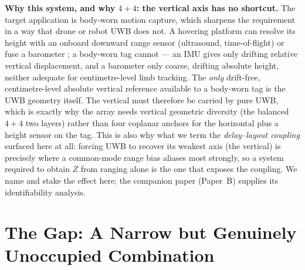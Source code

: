 \documentclass[11pt,a4paper]{article}
\begin{document}
\textbf{Why this system, and why $4{+}4$: the vertical axis has no shortcut.} The target application
is body-worn motion capture, which sharpens the requirement in a way that drone or robot UWB does
not. A hovering platform can resolve its height with an onboard downward range sensor (ultrasound,
time-of-flight) or fuse a barometer \citep{xiang_2025_uav}; a body-worn tag cannot --- an IMU gives only drifting relative
vertical displacement, and a barometer only coarse, drifting absolute height, neither adequate for
centimetre-level limb tracking. The \emph{only} drift-free, centimetre-level absolute vertical
reference available to a body-worn tag is the UWB geometry itself. The vertical must therefore be
carried by pure UWB, which is exactly why the array needs vertical geometric diversity (the balanced
$4{+}4$ two layers) rather than four coplanar anchors for the horizontal plus a height sensor on the tag.
This is also why what we term the \emph{delay--layout coupling} surfaced here at all: forcing UWB to
recover its weakest axis (the vertical) is precisely where a common-mode range bias aliases most
strongly, so a system required to obtain $Z$ from ranging alone is the one that exposes the coupling.
We name and stake the effect here; the companion paper (Paper~B) supplies its identifiability analysis.

\section{The Gap: A Narrow but Genuinely Unoccupied Combination}
\end{document}
